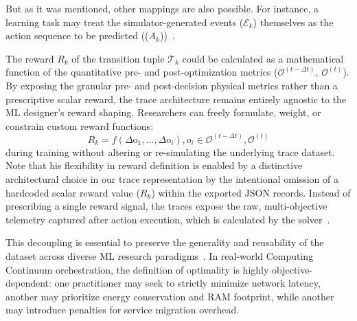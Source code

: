 \documentclass[ASNA]{USG} %
\begin{document}
But as it was mentioned, other mappings are also possible. For instance, a learning task may treat the simulator-generated events ($\mathcal{E}_k$) themselves as the action sequence to be predicted (($A_k$))~\cite{Prudencio2022A}.

The reward $R_k$ of the transition tuple $\mathcal{T}_k$ could be calculated as a mathematical function of the quantitative pre- and post-optimization metrics ($\mathcal{O}^{(t-\Delta t)}$, $\mathcal{O}^{(t)}$). By exposing the granular pre- and post-decision physical metrics rather than a prescriptive scalar reward, the trace architecture remains entirely agnostic to the ML designer's reward shaping. Researchers can freely formulate, weight, or constrain custom reward functions:
\begin{equation}
    R_k = f\left(\Delta\text{o}_1, ..., \Delta\text{o}_{i}\right), o_i \in \mathcal{O}^{(t-\Delta t)}, \mathcal{O}^{(t)}
\end{equation}
during training without altering or re-simulating the underlying trace dataset. Note that his flexibility in reward definition is enabled by a distinctive architectural choice in our trace representation by the intentional omission of a hardcoded scalar reward value ($R_k$) within the exported JSON records. Instead of prescribing a single reward signal, the traces expose the raw, multi-objective telemetry captured after action execution, which is calculated by the solver~\cite{Mannion2018Reward}.

This decoupling is essential to preserve the generality and reusability of the dataset across diverse ML research paradigms~\cite{Mu2025Preference}. In real-world Computing Continuum orchestration, the definition of optimality is highly objective-dependent: one practitioner may seek to strictly minimize network latency, another may prioritize energy conservation and RAM footprint, while another may introduce penalties for service migration overhead. 
\end{document}

